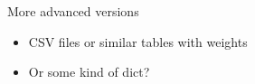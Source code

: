 \documentclass{beamer}
\begin{document}
{
	\begin{frame}[plain]
	\end{frame}
}


\begin{frame}{More advanced versions}
	\begin{itemize}
		\item CSV files or similar tables with weights
		\item Or some kind of dict?
	\end{itemize}
\end{frame}
\end{document}

